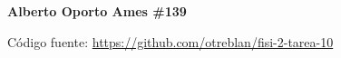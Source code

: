 \documentclass{article}
\begin{document}
\textbf{Alberto Oporto Ames \#139}

\thispagestyle{fancy}




Código fuente: \url{https://github.com/otreblan/fisi-2-tarea-10}
\end{document}
